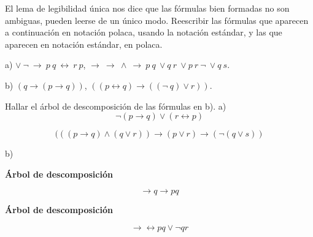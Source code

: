 	\begin{problem}[3]
	El lema de legibilidad \'unica nos dice que las f\'ormulas bien formadas no son ambiguas, pueden
	leerse de un \'unico modo. Reescribir las f\'ormulas que aparecen a continuaci\'on en notaci\'on polaca, usando
	la notaci\'on est\'andar, y las que aparecen en notaci\'on est\'andar, en polaca.
	
	a) $\vee \ \neg \ \to  \  p \  q \ \leftrightarrow \ r \  p$, 
	$\to\ \to \ \wedge \ \to \ p \ q \ \vee q \ r \ \vee p \ r \ \neg \ \vee q \ s$.
	
	b)  $(q \to  (p \to q ))$, $( (p \leftrightarrow q ) \to ((\neg \  q)  \vee  r))$.
	
	Hallar el \'arbol de descomposici\'on de las f\'ormulas en b). 
	\solution
	a)
	$$\neg(p\rightarrow q)\vee (r \leftrightarrow p)$$
	
	$$(((p\rightarrow q)\wedge (q \vee r)) \rightarrow (p \vee r) \rightarrow (\neg(q \vee s))$$
	
	b)
	
	\textbf{Árbol de descomposición}
	

	$$\rightarrow q \rightarrow pq$$
	
	\textbf{Árbol de descomposición}
	
	$$\rightarrow \leftrightarrow pq \vee \neg qr$$
	\end{problem}
	
